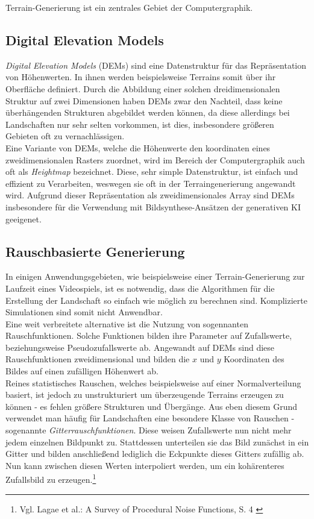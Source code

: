 Terrain-Generierung ist ein zentrales Gebiet der Computergraphik. 

\subsection{Digital Elevation Models}

\textit{Digital Elevation Models} (DEMs) sind eine Datenstruktur für das Repräsentation von Höhenwerten. In ihnen werden beispielsweise Terrains somit über ihr Oberfläche definiert. Durch die Abbildung einer solchen dreidimensionalen Struktur auf zwei Dimensionen haben DEMs zwar den Nachteil, dass keine überhängenden Strukturen abgebildet werden können, da diese allerdings bei Landschaften nur sehr selten vorkommen, ist dies, insbesondere größeren Gebieten oft zu vernachlässigen.\\
Eine Variante von DEMs, welche die Höhenwerte den koordinaten eines zweidimensionalen Rasters zuordnet, wird im Bereich der Computergraphik auch oft als \textit{Heightmap} bezeichnet. Diese, sehr simple Datenstruktur, ist einfach und effizient zu Verarbeiten, weswegen sie oft in der Terraingenerierung angewandt wird. Aufgrund dieser Repräsentation als zweidimensionales Array sind DEMs insbesondere für die Verwendung mit Bildsynthese-Ansätzen der generativen KI geeigenet.

\subsection{Rauschbasierte Generierung}

In einigen Anwendungsgebieten, wie beispielsweise einer Terrain-Generierung zur Laufzeit eines Videospiels, ist es notwendig, dass die Algorithmen für die Erstellung der Landschaft so einfach wie möglich zu berechnen sind. Komplizierte Simulationen sind somit nicht Anwendbar. \\ 
Eine weit verbreitete alternative ist die Nutzung von sogennanten Rauschfunktionen. Solche Funktionen bilden ihre Parameter auf Zufallswerte, beziehungsweise Pseudozufallswerte ab. Angewandt auf DEMs sind diese Rauschfunktionen zweidimensional und bilden die $x$ und $y$ Koordinaten des Bildes auf einen zufälligen Höhenwert ab. \\ 
Reines statistisches Rauschen, welches beispielsweise auf einer Normalverteilung basiert, ist jedoch zu unstrukturiert um überzeugende Terrains erzeugen zu können - es fehlen größere Strukturen und Übergänge. Aus eben diesem Grund verwendet man häufig für Landschaften eine besondere Klasse von Rauschen - sogenannte \textit{Gitterrauschfunktionen}. Diese weisen Zufallswerte nun nicht mehr jedem einzelnen Bildpunkt zu. Stattdessen unterteilen sie das Bild zunächst in ein Gitter und bilden anschließend lediglich die Eckpunkte dieses Gitters zufällig ab. Nun kann zwischen diesen Werten interpoliert werden, um ein kohärenteres Zufallsbild zu erzeugen.\footnote{
    Vgl. Lagae et al.: A Survey of Procedural Noise Functions, S. 4
    \cite{https://doi.org/10.1111/j.1467-8659.2010.01827.x}
}  

